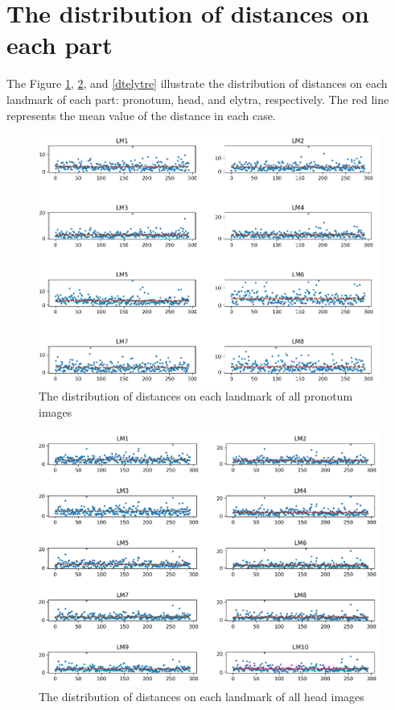 \documentclass[review]{elsarticle}
\begin{document}
\section{The distribution of distances on each part}
\label{appdixB}
The Figure \ref{dtpronotum}, \ref{dthead}, and \ref{dtelytre} illustrate the distribution of distances on each landmark of each part: pronotum, head, and elytra, respectively. The red line represents the mean value of the distance in each case.
\begin{figure}[htbp]
    \centering
    \includegraphics[width=.95\textwidth]{images/charts/pronotum_2.png}
    \caption{The distribution of distances on each landmark of all pronotum images}
    \label{dtpronotum}
\end{figure}

\begin{figure}[htbp]
    \centering
    \includegraphics[width=.95\textwidth]{images/charts/tete_2.png}
    \caption{The distribution of distances on each landmark of all head images}
    \label{dthead}
\end{figure}
\end{document}

